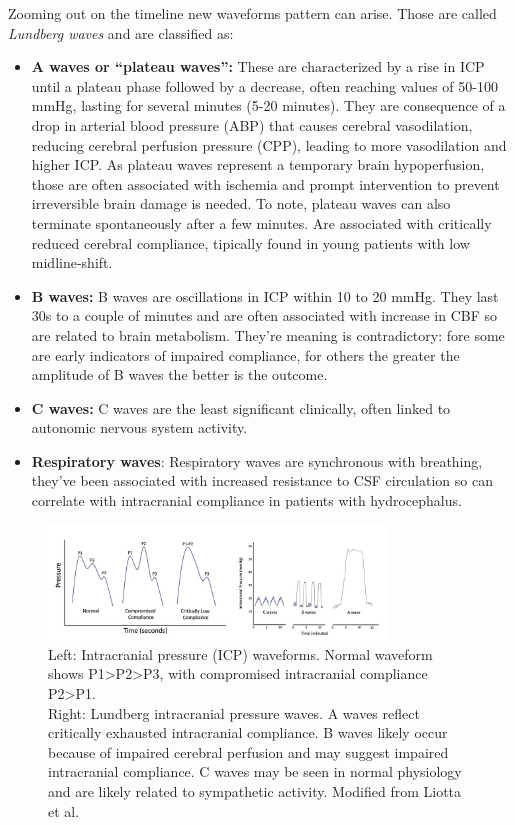 Zooming out on the timeline new waveforms pattern can arise. Those are called \textit{Lundberg waves} and are classified as: 
\begin{itemize}
    \item \textbf{A waves or “plateau waves”:}
    These are characterized by a rise in ICP until a plateau phase followed by a decrease, often reaching values of 50-100 mmHg, lasting for several minutes (5-20 minutes).
    They are consequence of a drop in arterial blood pressure (ABP) that causes cerebral vasodilation, reducing cerebral perfusion pressure (CPP), leading to more vasodilation and higher ICP. As plateau waves represent a temporary brain hypoperfusion, those are often associated with ischemia and prompt intervention to prevent irreversible brain damage is needed. To note, plateau waves can also terminate spontaneously after a few minutes. Are associated with critically reduced cerebral compliance, tipically found in young patients with low midline-shift.

    \item \textbf{B waves:} B waves are oscillations in ICP within 10 to 20 mmHg. They last 30s to a couple of minutes and are often associated with increase in CBF so are related to  brain metabolism. They're meaning is contradictory: fore some  are early indicators of impaired  compliance, for others the greater the amplitude of B waves the better is the outcome\cite{cuccioliniIntracranialPressureClinicians2023a}.
 
    \item \textbf{C waves:} C waves are the least significant clinically, often linked to autonomic nervous system activity. 
  
    \item \textbf{Respiratory waves}: Respiratory waves are synchronous with breathing, they've been associated with increased resistance to CSF circulation so can correlate with intracranial compliance in patients with hydrocephalus.\\

\end{itemize}

\begin{figure}[h]
    \centering
    \includegraphics[width=0.8\textwidth]{pictures/fig3.png}
    \caption{Left: Intracranial pressure (ICP) waveforms. Normal waveform shows P1>P2>P3, with compromised intracranial compliance P2>P1. \\ Right: Lundberg intracranial pressure waves. A waves reflect critically exhausted intracranial compliance. B waves likely occur because of impaired cerebral perfusion and may suggest impaired intracranial compliance. C waves may be seen in normal physiology and are likely related to sympathetic activity. Modified from Liotta et al.\cite{liottaManagementCerebralEdema2021}}
\end{figure}


